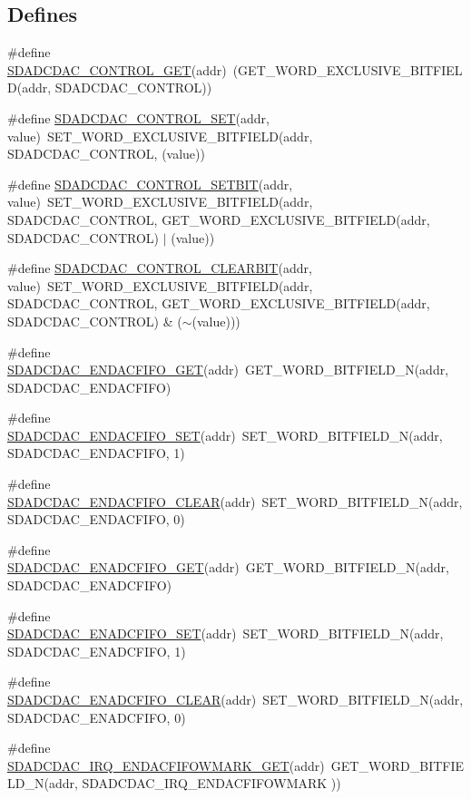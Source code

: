 \subsection*{Defines}
\begin{DoxyCompactItemize}
\item 
\#define \hyperlink{a00568_af3ca9e3699d8ba3e203e54691a107b12}{SDADCDAC\_\-CONTROL\_\-GET}(addr)~(GET\_\-WORD\_\-EXCLUSIVE\_\-BITFIELD(addr, SDADCDAC\_\-CONTROL))
\item 
\#define \hyperlink{a00568_a7f2fba8fdec04eeae40b25ebae69a2b7}{SDADCDAC\_\-CONTROL\_\-SET}(addr, value)~SET\_\-WORD\_\-EXCLUSIVE\_\-BITFIELD(addr, SDADCDAC\_\-CONTROL, (value))
\item 
\#define \hyperlink{a00568_a3b4329735f525e701fe84e4642a47921}{SDADCDAC\_\-CONTROL\_\-SETBIT}(addr, value)~SET\_\-WORD\_\-EXCLUSIVE\_\-BITFIELD(addr, SDADCDAC\_\-CONTROL, GET\_\-WORD\_\-EXCLUSIVE\_\-BITFIELD(addr, SDADCDAC\_\-CONTROL) $|$ (value))
\item 
\#define \hyperlink{a00568_a87b95e173234ae207229802c974a1bd6}{SDADCDAC\_\-CONTROL\_\-CLEARBIT}(addr, value)~SET\_\-WORD\_\-EXCLUSIVE\_\-BITFIELD(addr, SDADCDAC\_\-CONTROL, GET\_\-WORD\_\-EXCLUSIVE\_\-BITFIELD(addr, SDADCDAC\_\-CONTROL) \& ($\sim$(value)))
\item 
\#define \hyperlink{a00568_a7f4c054ff2322049573c626ba4f7983d}{SDADCDAC\_\-ENDACFIFO\_\-GET}(addr)~GET\_\-WORD\_\-BITFIELD\_\-N(addr, SDADCDAC\_\-ENDACFIFO)
\item 
\#define \hyperlink{a00568_a256d6dd132bbb796f1e2a82768e37102}{SDADCDAC\_\-ENDACFIFO\_\-SET}(addr)~SET\_\-WORD\_\-BITFIELD\_\-N(addr, SDADCDAC\_\-ENDACFIFO, 1)
\item 
\#define \hyperlink{a00568_ad2cf41d3f1355dd30f8a501908410ee0}{SDADCDAC\_\-ENDACFIFO\_\-CLEAR}(addr)~SET\_\-WORD\_\-BITFIELD\_\-N(addr, SDADCDAC\_\-ENDACFIFO, 0)
\item 
\#define \hyperlink{a00568_a11d8abec1040623e168e401f9013b015}{SDADCDAC\_\-ENADCFIFO\_\-GET}(addr)~GET\_\-WORD\_\-BITFIELD\_\-N(addr, SDADCDAC\_\-ENADCFIFO)
\item 
\#define \hyperlink{a00568_a6d9f841683f53688f038ab78838b9e69}{SDADCDAC\_\-ENADCFIFO\_\-SET}(addr)~SET\_\-WORD\_\-BITFIELD\_\-N(addr, SDADCDAC\_\-ENADCFIFO, 1)
\item 
\#define \hyperlink{a00568_aa28d9e587d2bc2f0566cbc2d42fcc587}{SDADCDAC\_\-ENADCFIFO\_\-CLEAR}(addr)~SET\_\-WORD\_\-BITFIELD\_\-N(addr, SDADCDAC\_\-ENADCFIFO, 0)
\item 
\#define \hyperlink{a00568_ab9349ab717a24b312c094d51e046351a}{SDADCDAC\_\-IRQ\_\-ENDACFIFOWMARK\_\-GET}(addr)~GET\_\-WORD\_\-BITFIELD\_\-N(addr, SDADCDAC\_\-IRQ\_\-ENDACFIFOWMARK ))

\end{DoxyCompactItemize}
